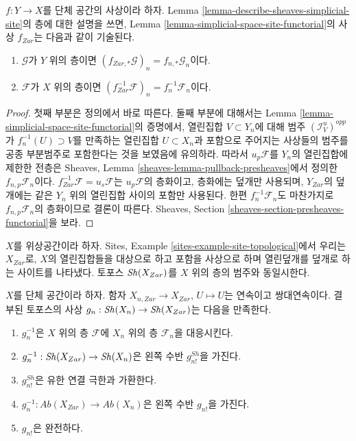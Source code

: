 \begin{lemma}
\label{lemma-describe-functoriality}
$f : Y \to X$를 단체 공간의 사상이라 하자. Lemma
\ref{lemma-describe-sheaves-simplicial-site}의 층에 대한 설명을 쓰면,
Lemma \ref{lemma-simplicial-space-site-functorial}의 사상 $f_{Zar}$는
다음과 같이 기술된다.
\begin{enumerate}
\item $\mathcal{G}$가 $Y$ 위의 층이면
$(f_{Zar, *}\mathcal{G})_n = f_{n, *}\mathcal{G}_n$이다.
\item $\mathcal{F}$가 $X$ 위의 층이면
$(f_{Zar}^{-1}\mathcal{F})_n = f_n^{-1}\mathcal{F}_n$이다.
\end{enumerate}
\end{lemma}

\begin{proof}
첫째 부분은 정의에서 바로 따른다. 둘째 부분에 대해서는 Lemma
\ref{lemma-simplicial-space-site-functorial}의 증명에서,
열린집합 $V \subset Y_n$에 대해 범주 $(\mathcal{I}_V^u)^{opp}$가
$f_n^{-1}(U) \supset V$를 만족하는 열린집합 $U \subset X_n$과
포함으로 주어지는 사상들의 범주를 공종 부분범주로 포함한다는 것을
보였음에 유의하라. 따라서 $u_p\mathcal{F}$를 $Y_n$의 열린집합에
제한한 전층은 Sheaves, Lemma
\ref{sheaves-lemma-pullback-presheaves}에서 정의한
$f_{n, p}\mathcal{F}_n$이다.
$f_{Zar}^{-1}\mathcal{F} = u_s\mathcal{F}$는 $u_p\mathcal{F}$의 층화이고,
층화에는 덮개만 사용되며, $Y_{Zar}$의 덮개에는 같은 $Y_n$ 위의
열린집합 사이의 포함만 사용된다. 한편 $f_n^{-1}\mathcal{F}_n$도
마찬가지로 $f_{n, p}\mathcal{F}_n$의 층화이므로 결론이 따른다.
Sheaves, Section \ref{sheaves-section-presheaves-functorial}을 보라.
\end{proof}

\noindent
$X$를 위상공간이라 하자. Sites, Example
\ref{sites-example-site-topological}에서 우리는 $X_{Zar}$로,
$X$의 열린집합들을 대상으로 하고 포함을 사상으로 하며 열린덮개를
덮개로 하는 사이트를 나타냈다. 토포스 $\mathop{\mathit{Sh}}\nolimits(X_{Zar})$를
$X$ 위의 층의 범주와 동일시한다.

\begin{lemma}
\label{lemma-restriction-to-components}
$X$를 단체 공간이라 하자. 함자
$X_{n, Zar} \to X_{Zar}$, $U \mapsto U$는 연속이고 쌍대연속이다.
결부된 토포스의 사상 $g_n : \mathop{\mathit{Sh}}\nolimits(X_n) \to \mathop{\mathit{Sh}}\nolimits(X_{Zar})$는
다음을 만족한다.
\begin{enumerate}
\item $g_n^{-1}$은 $X$ 위의 층 $\mathcal{F}$에
$X_n$ 위의 층 $\mathcal{F}_n$을 대응시킨다.
\item $g_n^{-1} : \mathop{\mathit{Sh}}\nolimits(X_{Zar}) \to \mathop{\mathit{Sh}}\nolimits(X_n)$은
왼쪽 수반 $g^{Sh}_{n!}$을 가진다.
\item $g^{Sh}_{n!}$은 유한 연결 극한과 가환한다.
\item $g_n^{-1} : \textit{Ab}(X_{Zar}) \to \textit{Ab}(X_n)$은
왼쪽 수반 $g_{n!}$을 가진다.
\item $g_{n!}$은 완전하다.
\end{enumerate}
\end{lemma}

